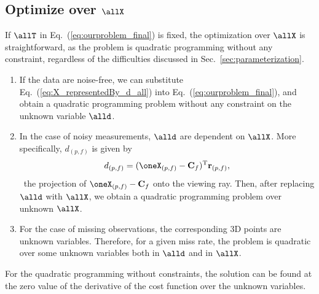 \subsection{Optimize over $\allX$} \label{sec:optimize_over_x}
If $\allT$ in Eq.~(\ref{eq:ourproblem_final}) is fixed, the optimization over $\allX$ is straightforward, as the problem is quadratic programming without any constraint, regardless of the difficulties discussed in Sec.~\ref{sec:parameterization}.
\begin{enumerate}%
\item {If the data are noise-free,
we can substitute Eq.~(\ref{eq:X_representedBy_d_all}) into Eq.~(\ref{eq:ourproblem_final}),
and obtain a quadratic programming problem without any constraint on the unknown variable $\alld$. }
\item{
In the case of noisy measurements, $\alld$ are dependent on $\allX$. More specifically, $d_{(p,f)}$ is given by
\begin{equation}
d_{(p,f)}=(\oneX_{(p,f)}-\mathbf{C}_{f})^\text{T}\mathbf{r}_{(p,f)}, 
\end{equation}
\ie~the projection of $\oneX_{(p,f)}-\mathbf{C}_{f}$ onto the viewing ray. Then, after replacing $\alld$ with $\allX$, we obtain a quadratic programming problem over unknown $\allX$.
}
\item{ For the case of missing observations, the corresponding 3D points are unknown variables. Therefore, for a given miss rate, the problem is quadratic over some unknown variables both in $\alld$ and in $\allX$.
}
\end{enumerate}
For the quadratic programming without constraints, the solution can be found at the zero value of the derivative of the cost function over the unknown variables.

